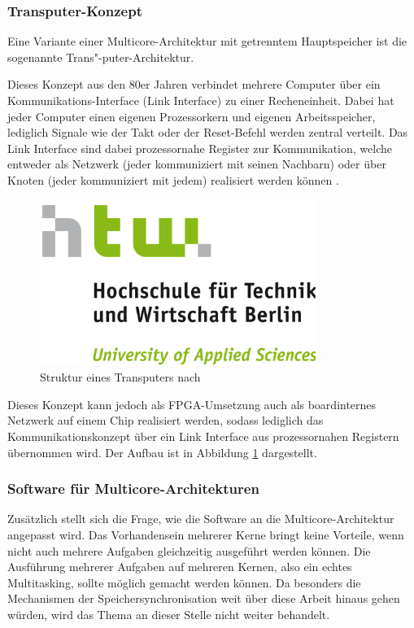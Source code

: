\documentclass[11pt,a4paper,titlepage]{article}
\begin{document}
\subsubsection{Transputer-Konzept}

Eine Variante einer Multicore-Architektur mit getrenntem Hauptspeicher ist die sogenannte Trans"-puter-Architektur. 

Dieses Konzept aus den 80er Jahren verbindet mehrere Computer über ein Kommunikations-Interface (Link Interface) zu einer Recheneinheit. Dabei hat jeder Computer einen eigenen Prozessorkern und eigenen Arbeitsspeicher, lediglich Signale wie der Takt oder der Reset-Befehl werden zentral verteilt. Das Link Interface sind dabei prozessornahe Register zur Kommunikation, welche entweder als Netzwerk (jeder kommuniziert mit seinen Nachbarn) oder über Knoten (jeder kommuniziert mit jedem) realisiert werden können \cite[S. 3 ff.]{Transputer}.\\

\begin{figure}[!ht]
\centering
\includegraphics[width=0.8\textwidth]{images/htw_hochschule.png}
\caption{Struktur eines Transputers nach \cite{Transputer}}
\label{img:Transputer}
\end{figure}

Dieses Konzept kann jedoch als FPGA-Umsetzung auch als boardinternes Netzwerk auf einem Chip realisiert werden, sodass lediglich das Kommunikationskonzept über ein Link Interface aus prozessornahen Registern übernommen wird. Der Aufbau ist in Abbildung \ref{img:Transputer} dargestellt.


\subsubsection{Software für Multicore-Architekturen}

Zusätzlich stellt sich die Frage, wie die Software an die Multicore-Architektur angepasst wird. Das Vorhandensein mehrerer Kerne bringt keine Vorteile, wenn nicht auch mehrere Aufgaben gleichzeitig ausgeführt werden können. Die Ausführung mehrerer Aufgaben auf mehreren Kernen, also ein echtes Multitasking, sollte möglich gemacht werden können. Da besonders die Mechanismen der Speichersynchronisation weit über diese Arbeit hinaus gehen würden, wird das Thema an dieser Stelle nicht weiter behandelt.
\end{document}
